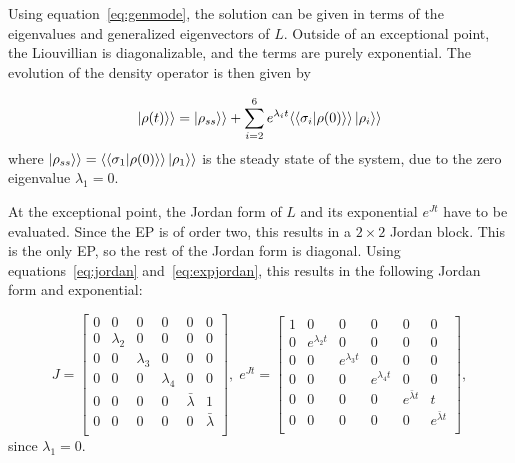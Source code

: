 \documentclass[../main.tex]{subfiles}
\begin{document}
Using equation~\eqref{eq:genmode}, the solution can be given in terms of the eigenvalues and generalized eigenvectors of $L$. Outside of an exceptional point, the Liouvillian is diagonalizable, and the terms are purely exponential. The evolution of the density operator is then given by

\begin{equation}\label{eq:dynnonep}
    \ket{\rho(t)}\rangle = \ket{\rho_{ss}}\rangle + \sum_{i=2}^6 e^{\lambda_i t} \langle\braket{\sigma_i|\rho(0)}\rangle \ket{\rho_i}\rangle
\end{equation}
where $\ket{\rho_{ss}}\rangle = \langle\braket{\sigma_1|\rho(0)}\rangle \ket{\rho_1}\rangle$ is the steady state of the system, due to the zero eigenvalue $\lambda_1=0$.

At the exceptional point, the Jordan form of $L$ and its exponential $e^{Jt}$ have to be evaluated. Since the EP is of order two, this results in a $2\times2$ Jordan block. This is the only EP, so the rest of the Jordan form is diagonal. Using equations~\eqref{eq:jordan} and~\eqref{eq:expjordan}, this results in the following Jordan form and exponential:

\begin{equation}
    J = \begin{bmatrix} 0 & 0 & 0 & 0 & 0 & 0 \\
                        0 & \lambda_2 & 0 & 0 & 0 & 0 \\
                        0 & 0 & \lambda_3 & 0 & 0 & 0 \\
                        0 & 0 & 0 & \lambda_4 & 0 & 0 \\
                        0 & 0 & 0 & 0 & \bar \lambda & 1 \\
                        0 & 0 & 0 & 0 & 0 & \bar \lambda \\ \end{bmatrix}, \; 
        e^{Jt} = \begin{bmatrix} 1 & 0 & 0 & 0 & 0 & 0 \\
            0 & e^{\lambda_2t} & 0 & 0 & 0 & 0 \\
            0 & 0 & e^{\lambda_3t} & 0 & 0 & 0 \\
            0 & 0 & 0 & e^{\lambda_4t} & 0 & 0 \\
            0 & 0 & 0 & 0 & e^{\bar \lambda t} & t \\
        0 & 0 & 0 & 0 & 0 & e^{\bar \lambda t} \\ \end{bmatrix},
\end{equation}
since $\lambda_1 = 0$.
\end{document}
